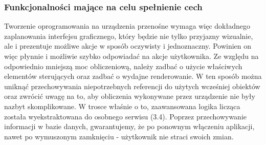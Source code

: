  \subsubsection{Funkcjonalności mające na celu spełnienie cech}
 Tworzenie oprogramowania na urządzenia przenośne wymaga więc dokładnego zaplanowania interfejsu graficznego, który będzie nie tylko przyjazny wizualnie, ale i prezentuje możliwe akcje w sposób oczywisty i jednoznaczny. Powinien on więc płynnie i możliwie szybko odpowiadać na akcje użytkownika. Ze względu na odpowiednio mniejszą moc obliczeniową, należy zadbać o użycie właściwych elementów sterujących oraz zadbać o wydajne renderowanie. W ten sposób można uniknąć przechowywania niepotrzebnych referencji do użytych wcześniej obiektów oraz zwrócić uwagę na to, aby obliczenia wykonywane przez urządzenie nie były nazbyt skomplikowane. W trosce właśnie o to, zaawansowana logika licząca została wyekstraktowana do osobnego serwisu (3.4). Poprzez przechowywanie informacji w bazie danych, gwarantujemy, że po ponownym włączeniu aplikacji, nawet po wymuszonym zamknięciu - użytkownik nie straci swoich zmian.